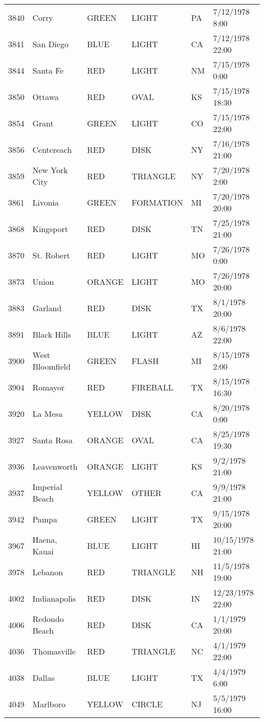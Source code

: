 \begin{tabular}{llllll}
3840 & Corry & GREEN & LIGHT & PA & 7/12/1978 8:00 \\
3841 & San Diego & BLUE & LIGHT & CA & 7/12/1978 22:00 \\
3844 & Santa Fe & RED & LIGHT & NM & 7/15/1978 0:00 \\
3850 & Ottawa & RED & OVAL & KS & 7/15/1978 18:30 \\
3854 & Grant & GREEN & LIGHT & CO & 7/15/1978 22:00 \\
3856 & Centereach & RED & DISK & NY & 7/16/1978 21:00 \\
3859 & New York City & RED & TRIANGLE & NY & 7/20/1978 2:00 \\
3861 & Livonia & GREEN & FORMATION & MI & 7/20/1978 20:00 \\
3868 & Kingsport & RED & DISK & TN & 7/25/1978 21:00 \\
3870 & St. Robert & RED & LIGHT & MO & 7/26/1978 0:00 \\
3873 & Union & ORANGE & LIGHT & MO & 7/26/1978 20:00 \\
3883 & Garland & RED & DISK & TX & 8/1/1978 20:00 \\
3891 & Black Hills & BLUE & LIGHT & AZ & 8/6/1978 22:00 \\
3900 & West Bloomfield & GREEN & FLASH & MI & 8/15/1978 2:00 \\
3904 & Romayor & RED & FIREBALL & TX & 8/15/1978 16:30 \\
3920 & La Mesa & YELLOW & DISK & CA & 8/20/1978 0:00 \\
3927 & Santa Rosa & ORANGE & OVAL & CA & 8/25/1978 19:30 \\
3936 & Leavenworth & ORANGE & LIGHT & KS & 9/2/1978 21:00 \\
3937 & Imperial Beach & YELLOW & OTHER & CA & 9/9/1978 21:00 \\
3942 & Pampa & GREEN & LIGHT & TX & 9/15/1978 20:00 \\
3967 & Haena, Kauai & BLUE & LIGHT & HI & 10/15/1978 21:00 \\
3978 & Lebanon & RED & TRIANGLE & NH & 11/5/1978 19:00 \\
4002 & Indianapolis & RED & DISK & IN & 12/23/1978 22:00 \\
4006 & Redondo Beach & RED & DISK & CA & 1/1/1979 20:00 \\
4036 & Thomasville & RED & TRIANGLE & NC & 4/1/1979 22:00 \\
4038 & Dallas & BLUE & LIGHT & TX & 4/4/1979 6:00 \\
4049 & Marlboro & YELLOW & CIRCLE & NJ & 5/5/1979 16:00 \\

\end{tabular}
